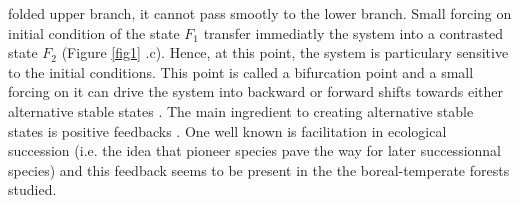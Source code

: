 folded upper branch, it cannot pass smootly to the lower branch. Small forcing
on initial condition of the state $F_1$ transfer immediatly the system into a
contrasted state $F_2$ (Figure \ref{fig1} .c). Hence, at this point, the
system is particulary sensitive to the initial conditions. This point is
called a bifurcation point and a small forcing on it can drive the system into
backward or forward shifts towards either alternative stable states
\cite{scheffer2009critical}. The main ingredient to creating alternative
stable states is positive feedbacks \cite{scheffer2009critical}. One well
known is facilitation in ecological succession (i.e. the idea that pioneer
species pave the way for later successionnal species) and this feedback seems
to be present in the the boreal-temperate forests studied. \\

